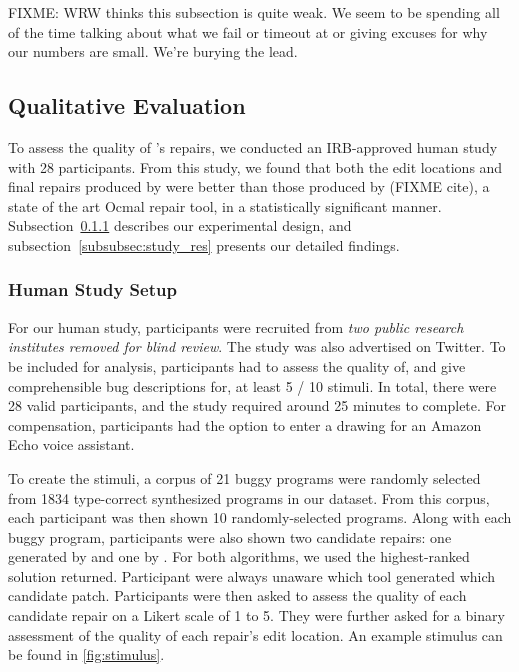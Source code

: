 FIXME: WRW thinks this subsection is quite weak. We seem to be spending all
of the time talking about what we fail or timeout at or giving excuses for
why our numbers are small. We're burying the lead. 


\subsection{Qualitative Evaluation}
\label{subsec:quan_eval}

To assess the quality of \toolname's repairs, we conducted an IRB-approved human
study with 28 participants. From this study, we found that both the edit
locations and final repairs produced by \toolname were better than those
produced by \seminal (FIXME cite), a state of the art Ocmal repair tool, in a
statistically significant manner. Subsection~\ref{subsubsec:study_setup}
describes our experimental design, and subsection~\ref{subsubsec:study_res}
presents our detailed findings.

\subsubsection{Human Study Setup}
\label{subsubsec:study_setup}


For our human study, participants were recruited from \emph{two public research
institutes removed for blind review}. The study was also advertised on Twitter.
To be included for analysis, participants had to assess the quality of, and give
comprehensible bug descriptions for, at least 5 / 10 stimuli. In total, there were
28 valid participants, and the study required around 25 minutes to complete. For
compensation, participants had the option to enter a drawing for an Amazon Echo
voice assistant.

To create the stimuli, a corpus of 21 buggy programs were randomly selected from
1834 type-correct synthesized programs in our dataset. 
From this corpus, each participant was
then shown 10 randomly-selected programs. Along with each buggy program,
participants were also shown two candidate repairs: one generated by \toolname
and one by \seminal. For both algorithms, we used the highest-ranked solution 
returned. Participant were always unaware which tool generated which
candidate patch. Participants were then asked to assess the quality of each
candidate repair on a Likert scale of 1 to 5. They were further asked for a
binary assessment of the quality of each repair's edit location. An example
stimulus can be found in \autoref{fig:stimulus}.

